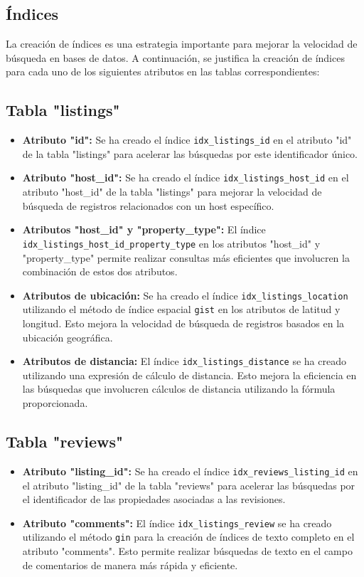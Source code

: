\subsection{Índices}

La creación de índices es una estrategia importante para mejorar la velocidad de búsqueda en bases de datos. A continuación, se justifica la creación de índices para cada uno de los siguientes atributos en las tablas correspondientes:

\subsection*{Tabla "listings"}

\begin{itemize}
  \item \textbf{Atributo "id":} Se ha creado el índice \texttt{idx\_listings\_id} en el atributo "id" de la tabla "listings" para acelerar las búsquedas por este identificador único.
  \item \textbf{Atributo "host\_id":} Se ha creado el índice \texttt{idx\_listings\_host\_id} en el atributo "host\_id" de la tabla "listings" para mejorar la velocidad de búsqueda de registros relacionados con un host específico.
  \item \textbf{Atributos "host\_id" y "property\_type":} El índice \\ \texttt{idx\_listings\_host\_id\_property\_type} en los atributos "host\_id" y "property\_type" permite realizar consultas más eficientes que involucren la combinación de estos dos atributos.
  \item \textbf{Atributos de ubicación:} Se ha creado el índice \texttt{idx\_listings\_location} utilizando el método de índice espacial \texttt{gist} en los atributos de latitud y longitud. Esto mejora la velocidad de búsqueda de registros basados en la ubicación geográfica.
  \item \textbf{Atributos de distancia:} El índice \texttt{idx\_listings\_distance} se ha creado utilizando una expresión de cálculo de distancia. Esto mejora la eficiencia en las búsquedas que involucren cálculos de distancia utilizando la fórmula proporcionada.
\end{itemize}

\subsection*{Tabla "reviews"}

\begin{itemize}
  \item \textbf{Atributo "listing\_id":} Se ha creado el índice \texttt{idx\_reviews\_listing\_id} en el atributo "listing\_id" de la tabla "reviews" para acelerar las búsquedas por el identificador de las propiedades asociadas a las revisiones.
  \item \textbf{Atributo "comments":} El índice \texttt{idx\_listings\_review} se ha creado utilizando el método \texttt{gin} para la creación de índices de texto completo en el atributo "comments". Esto permite realizar búsquedas de texto en el campo de comentarios de manera más rápida y eficiente.
\end{itemize}

